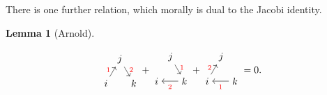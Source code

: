 \documentclass{shortart}
\newtheorem{lemma}[thm]{Lemma}
\theoremstyle{definition}
\begin{document}
There is one further relation, which morally is dual to the Jacobi identity.
\begin{lemma}[Arnold]
  \begin{useimager}
    \[
      \begin{tikzpicture}[scale=0.5, baseline={([yshift=-.5ex]current bounding box.center)}]
        \node (i) at (-1, 0) {$i$};
        \node (k) at (1, 0) {$k$};
        \node (j) at (0, 1.732) {$j$};

        \draw [->] (i) -- (j) node [pos=0.7, left] {\scriptsize \color{red} 1};
        \draw [->] (j) -- (k) node [pos=0.3, right] {\scriptsize \color{red} 2};
      \end{tikzpicture}
      +
      \begin{tikzpicture}[scale=0.5, baseline={([yshift=-.5ex]current bounding box.center)}]
        \node (i) at (-1, 0) {$i$};
        \node (k) at (1, 0) {$k$};
        \node (j) at (0, 1.732) {$j$};

        \draw [->] (j) -- (k) node [pos=0.3, right] {\scriptsize \color{red} 1};
        \draw [->] (k) -- (i) node [pos=0.5, below] {\scriptsize \color{red} 2};
      \end{tikzpicture}
      +
      \begin{tikzpicture}[scale=0.5, baseline={([yshift=-.5ex]current bounding box.center)}]
        \node (i) at (-1, 0) {$i$};
        \node (k) at (1, 0) {$k$};
        \node (j) at (0, 1.732) {$j$};

        \draw [->] (k) -- (i) node [pos=0.5, below] {\scriptsize \color{red} 1};
        \draw [->] (i) -- (j) node [pos=0.7, left] {\scriptsize \color{red} 2};
      \end{tikzpicture}
      = 0.
    \]
  \end{useimager}
\end{lemma}
\end{document}
